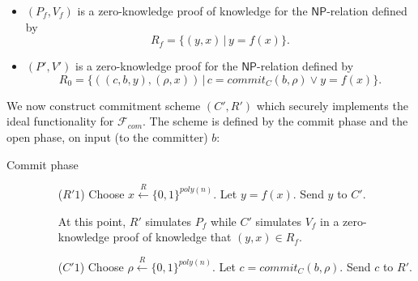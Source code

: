 \documentclass[draft]{article}
\newcommand{\class}[1]{{\ensuremath{\mathsf{#1}}}}
\newcommand{\getr}{\overset{R}{\gets}}
\newcommand{\getrsingle}{\getr\{0, 1\}}
\newcommand{\getrpoly}{\getrsingle^{poly(n)}}
\newcommand{\NP}{\class{NP}}
\begin{document}
\begin{enumerate}
\begin{enumerate}
\begin{itemize}
    \item $(P_f, V_f)$ is a zero-knowledge proof of knowledge for the \NP-relation defined by
      \begin{displaymath}
        R_f=\{(y, x)\,|\,y = f(x)\}.
      \end{displaymath}
    \item $(P', V')$ is a zero-knowledge proof for the \NP-relation defined by
      \begin{displaymath}
        R_0=\{((c, b, y), (\rho, x)) \,|\, c = commit_C(b, \rho) \lor y = f(x)\}.
      \end{displaymath}
    \end{itemize}
    We now construct commitment scheme $(C', R')$ which securely implements the ideal functionality for $\mathcal{F}_{com}$.
    The scheme is defined by the commit phase and the open phase, on input (to the committer) $b$:
    \begin{description}
    \item[Commit phase] \hfill
      \begin{enumerate}
      \item[($R'1$)]
        Choose $x\getrpoly$.
        Let $y = f(x)$.
        Send $y$ to $C'$.

        At this point, $R'$ simulates $P_f$ while $C'$ simulates $V_f$ in a zero-knowledge proof of knowledge that $(y, x)\in R_f$.
      \item[($C'1$)]
        Choose $\rho\getrpoly$.
        Let $c=commit_C(b, \rho)$.
        Send $c$ to $R'$.


\end{enumerate}
\end{description}
\end{enumerate}
\end{enumerate}
\end{document}
